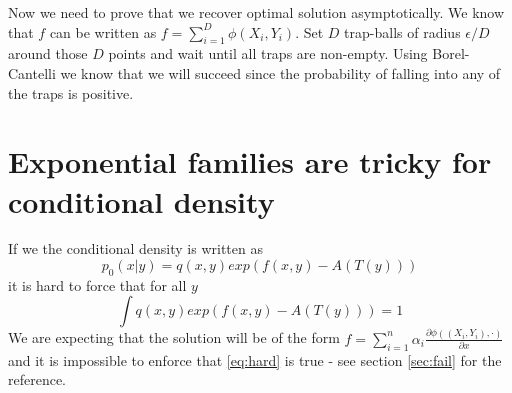 \documentclass[10pt]{article}
\begin{document}
Now we need to prove that we recover optimal solution asymptotically. We know that $f$ can be written as $f = \sum_{i=1}^{D} \phi(X_i,Y_i)$. Set $D$ trap-balls of radius $\epsilon/D$ around those $D$ points and wait until all traps are non-empty. Using Borel-Cantelli we know that we will succeed since the probability of falling into any of the traps is positive.          



\section{Exponential families are tricky for conditional density}
If we the conditional density is written as 
\begin{equation}
p_0(x|y) = q(x,y)exp(f(x,y) - A(T(y)) )
\end{equation} 
it is hard to force that for all $y$
\begin{equation}
\label{eq:hard}
\int q(x,y)exp(f(x,y) - A(T(y)) )=1
\end{equation}
We are expecting that the solution will be of the form $f = \sum_{i=1}^n \alpha_i \frac{\partial  \phi( (X_i,Y_i), \cdot)} {\partial x} $ and it is impossible to enforce that \eqref{eq:hard} is true - see section \ref{sec:fail} for the reference.
\end{document}
